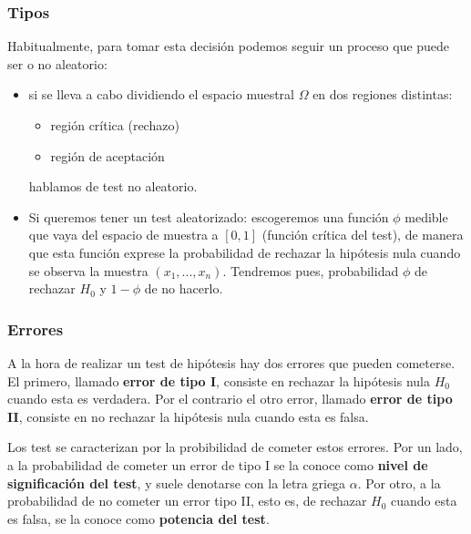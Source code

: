 \documentclass[a4paper,12pt]{article}
\begin{document}
\subsubsection{Tipos}
Habitualmente, para tomar esta decisión podemos seguir un proceso que puede ser o no aleatorio: 
\begin{itemize}
    \item si se lleva a cabo dividiendo el espacio muestral $\Omega$ en dos regiones distintas: 
	\begin{itemize}
		\item región crítica (rechazo)
		\item región de aceptación 
	\end{itemize} 
	hablamos de test no aleatorio.
	\item Si queremos tener un test aleatorizado: escogeremos una función $\phi$ medible que vaya del espacio de muestra a $[0,1]$ (función crítica del test), de manera que esta función exprese la probabilidad de rechazar la hipótesis nula cuando se observa la muestra $(x_1,...,x_n)$.
	Tendremos pues, probabilidad $\phi$ de rechazar $H_0$ y $1-\phi$ de no hacerlo. 
\end{itemize}

\subsubsection{Errores}

    A la hora de realizar un test de hipótesis hay dos errores que pueden cometerse.
    El primero, llamado \textbf{error de tipo I}, consiste en rechazar la hipótesis nula $H_0$ cuando esta es verdadera.
    Por el contrario el otro error, llamado \textbf{error de tipo II}, consiste en no rechazar la hipótesis nula cuando esta es falsa.

    Los test se caracterizan por la probibilidad de cometer estos errores.
    Por un lado, a la probabilidad de cometer un error de tipo I se la conoce como \textbf{nivel de significación del test}, y suele denotarse con la letra griega $\alpha$.
    Por otro, a la probabilidad de no cometer un error tipo II, esto es, de rechazar $H_0$ cuando esta es falsa, se la conoce como \textbf{potencia del test}.

\end{document}

